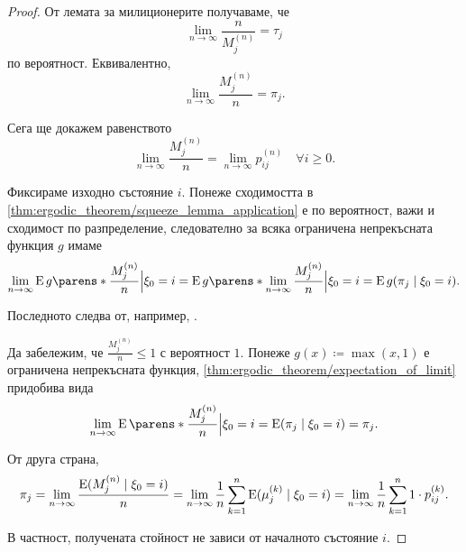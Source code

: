 \documentclass{../../common/topic}
\begin{document}
\begin{proof}
  От лемата за милиционерите получаваме, че
  \begin{equation*}
    \lim_{n \to \infty} \frac n {M^{(n)}_j}
    =
    \tau_j
  \end{equation*}
  по вероятност. Еквивалентно,
  \begin{equation}\label{thm:ergodic_theorem/squeeze_lemma_application}
    \lim_{n \to \infty} \frac {M^{(n)}_j} n
    =
    \pi_j.
  \end{equation}

  Сега ще докажем равенството
  \begin{equation*}
    \lim_{n \to \infty} \frac {M^{(n)}_j} n
    =
    \lim_{n \to \infty} p_{ij}^{(n)} \quad\forall i \geq 0.
  \end{equation*}

  Фиксираме изходно състояние \( i \). Понеже сходимостта в \eqref{thm:ergodic_theorem/squeeze_lemma_application} е по вероятност, важи и сходимост по разпределение, следователно за всяка ограничена непрекъсната функция \( g \) имаме
  \begin{equation}\label{thm:ergodic_theorem/expectation_of_limit}
    \lim_{n \to \infty} \Expect g\parens*{ \frac {M^{(n)}_j} n \Bigl\vert \xi_0 = i } = \Expect g\parens*{ \lim_{n \to \infty} \frac {M^{(n)}_j} n \Bigl\vert \xi_0 = i } = \Expect g(\pi_j \mid \xi_0 = i).
  \end{equation}

  Последното следва от, например, \cite[следствие 2 на стр. 119]{Боровков1999Вероятности}.

  Да забележим, че \( \frac {M^{(n)}_j} n \leq 1 \) с вероятност \( 1 \). Понеже \( g(x) \coloneqq \max(x, 1) \) е ограничена непрекъсната функция, \eqref{thm:ergodic_theorem/expectation_of_limit} придобива вида
  \begin{equation*}
    \lim_{n \to \infty} \Expect \parens*{ \frac {M^{(n)}_j} n \Bigl\vert \xi_0 = i } = \Expect (\pi_j \mid \xi_0 = i) = \pi_j.
  \end{equation*}

  От друга страна,
  \begin{equation*}
    \pi_j
    =
    \lim_{n \to \infty} \frac {\operatorname{E}(M^{(n)}_j \mid \xi_0 = i)} n
    =
    \lim_{n \to \infty} \frac 1 n \sum_{k=1}^n \operatorname{E}(\mu^{(k)}_j \mid \xi_0 = i)
    =
    \lim_{n \to \infty} \frac 1 n \sum_{k=1}^n 1 \cdot p_{ij}^{(k)}.
  \end{equation*}

  В частност, получената стойност не зависи от началното състояние \( i \).


\end{proof}
\end{document}
